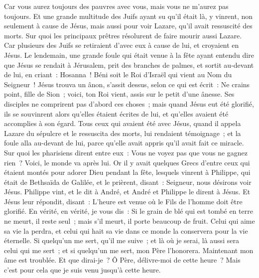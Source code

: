 \begin{multicols}{2}
Car vous aurez toujours des pauvres avec vous, mais vous ne m'aurez pas toujours.
Et une grande multitude des Juifs ayant su qu'il était là, y vinrent, non seulement à cause de Jésus, mais aussi pour voir Lazare, qu'il avait ressuscité des morts.
Sur quoi les principaux prêtres résolurent de faire mourir aussi Lazare.
Car plusieurs des Juifs se retiraient d'avec eux à cause de lui, et croyaient en Jésus.
Le lendemain, une grande foule qui était venue à la fête ayant entendu dire que Jésus se rendait à Jérusalem,
prit des branches de palmes, et sortit au-devant de lui, en criant~: Hosanna~! Béni soit le Roi d'Israël qui vient au Nom du Seigneur~!
Jésus trouva un ânon, s'assit dessus, selon ce qui est écrit~:
Ne crains point, fille de Sion~; voici, ton Roi vient, assis sur le petit d'une ânesse.
Ses disciples ne comprirent pas d'abord ces choses~; mais quand Jésus eut été glorifié, ils se souvinrent alors qu'elles étaient écrites de lui, et qu'elles avaient été accomplies à son égard.
Tous ceux qui avaient été avec Jésus, quand il appela Lazare du sépulcre et le ressuscita des morts, lui rendaient témoignage~;
et la foule alla au-devant de lui, parce qu'elle avait appris qu'il avait fait ce miracle.
Sur quoi les pharisiens dirent entre eux~: Vous ne voyez pas que vous ne gagnez rien~? Voici, le monde va après lui.
Or il y avait quelques Grecs d'entre ceux qui étaient montés pour adorer Dieu pendant la fête,
lesquels vinrent à Philippe, qui était de Bethsaïda de Galilée, et le prièrent, disant~: Seigneur, nous désirons voir Jésus.
Philippe vint, et le dit à André, et André et Philippe le dirent à Jésus.
Et Jésus leur répondit, disant~: L'heure est venue où le Fils de l'homme doit être glorifié.
En vérité, en vérité, je vous dis~: Si le grain de blé qui est tombé en terre ne meurt, il reste seul~; mais s'il meurt, il porte beaucoup de fruit.
Celui qui aime sa vie la perdra, et celui qui hait sa vie dans ce monde la conservera pour la vie éternelle.
Si quelqu'un me sert, qu'il me suive~; et là où je serai, là aussi sera celui qui me sert~; et si quelqu'un me sert, mon Père l'honorera.
Maintenant mon âme est troublée. Et que dirai-je~? Ô Père, délivre-moi de cette heure~? Mais c'est pour cela que je suis venu jusqu'à cette heure.

\end{multicols}
